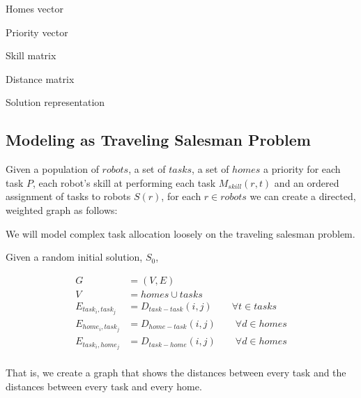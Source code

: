 \documentclass[a4paper]{article}
\begin{document}
Homes vector

Priority vector

Skill matrix

Distance matrix

Solution representation

\subsection{Modeling as Traveling Salesman Problem}


Given a population of $\mathit{robots}$, a set of $\mathit{tasks}$, a set of $\mathit{homes}$ a priority for each task $P$, each robot's skill at performing each task $M_{skill}(r,t)$ and an ordered assignment of tasks to robots $S(r)$, for each $r \in \mathit{robots}$
we can create a directed, weighted graph as follows:

We will model complex task allocation loosely on the traveling salesman problem.

Given a random initial solution, $S_0$,

\begin{align*}
	G &= (V, E) \\
	V &= \mathit{homes} \cup \mathit{tasks} \\
	E_{task_i, task_j} &= D_\mathit{task-task}(i,j) \qquad \forall t \in \mathit{tasks} \\
  E_{home_i, task_j} &= D_\mathit{home-task}(i,j) \qquad \forall d \in \mathit{homes}\\
	E_{task_i, home_j} &= D_\mathit{task-home}(i,j) \qquad \forall d \in \mathit{homes}\\
\end{align*}
%

That is, we create a graph that shows the distances between every task and the distances between every task and every home.
\end{document}
